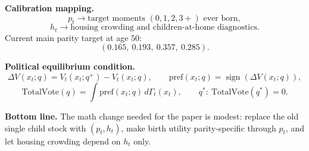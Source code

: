 \documentclass[10pt]{article}
\begin{document}
\textbf{Calibration mapping.}
\[
p_t \longrightarrow \text{target moments }(0,1,2,3+) \text{ ever born},
\]
\[
h_t \longrightarrow \text{housing crowding and children-at-home diagnostics}.
\]
Current main parity target at age $50$:
\[
(0.165,\ 0.193,\ 0.357,\ 0.285).
\]

\textbf{Political equilibrium condition.}
\[
\Delta V(x_t;q)=V_t(x_t;q^{+})-V_t(x_t;q), \qquad \text{pref}(x_t;q)=\operatorname{sign}(\Delta V(x_t;q)),
\]
\[
\text{TotalVote}(q)=\int \text{pref}(x_t;q)\,d\Gamma_t(x_t),
\qquad
q^{*}:\ \text{TotalVote}(q^{*})=0.
\]

\textbf{Bottom line.} The math change needed for the paper is modest: replace the old single child stock
with $(p_t,h_t)$, make birth utility parity-specific through $p_t$, and let housing crowding depend on
$h_t$ only.
\end{document}
